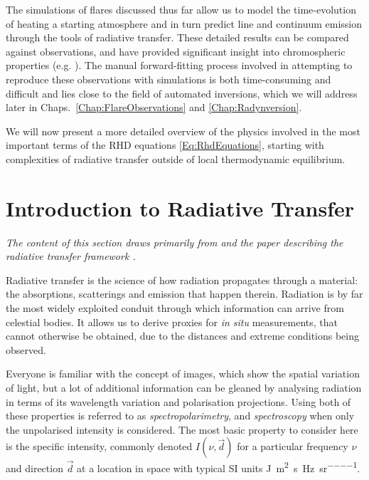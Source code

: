 The simulations of flares discussed thus far allow us to model the time-evolution of heating a starting atmosphere and in turn predict line and continuum emission through the tools of radiative transfer.
These detailed results can be compared against observations, and have provided significant insight into chromospheric properties (e.g. \citet{Kuridze2015,RubioDaCosta2016,Kowalski2017,Simoes2017}).
The manual forward-fitting process involved in attempting to reproduce these observations with simulations is both time-consuming and difficult and lies close to the field of automated inversions, which we will address later in Chaps.~\ref{Chap:FlareObservations} and \ref{Chap:Radynversion}.

We will now present a more detailed overview of the physics involved in the most important terms of the RHD equations \eqref{Eq:RhdEquations}, starting with complexities of radiative transfer outside of local thermodynamic equilibrium.

\section{Introduction to Radiative Transfer}\label{Sec:IntroRT}

\emph{The content of this section draws primarily from \citet{Hubeny2014} and the paper describing the \Lw{} radiative transfer framework \citep{Osborne2021}.}

Radiative transfer is the science of how radiation propagates through a material: the absorptions, scatterings and emission that happen therein.
Radiation is by far the most widely exploited conduit through which information can arrive from celestial bodies.
It allows us to derive proxies for \emph{in situ} measurements, that cannot otherwise be obtained, due to the distances and extreme conditions being observed.

Everyone is familiar with the concept of images, which show the spatial variation of light, but a lot of additional information can be gleaned by analysing radiation in terms of its wavelength variation and polarisation projections.
Using both of these properties is referred to as \emph{spectropolarimetry}, and \emph{spectroscopy} when only the unpolarised intensity is considered.
The most basic property to consider here is the specific intensity, commonly denoted $I(\nu, \vec{d})$ for a particular frequency $\nu$ and direction $\vec{d}$ at a location in space with typical SI units \si{\joule\per\square\metre\per\s\per\hertz\per\steradian}.

